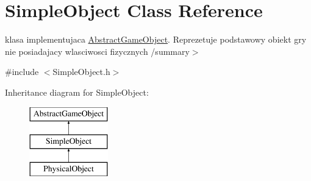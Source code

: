 \hypertarget{class_simple_object}{}\section{Simple\+Object Class Reference}
\label{class_simple_object}


klasa implementujaca \hyperlink{class_abstract_game_object}{Abstract\+Game\+Object}. Reprezetuje podstawowy obiekt gry nie posiadajacy wlasciwosci fizycznych /summary$>$  




{\ttfamily \#include $<$Simple\+Object.\+h$>$}

Inheritance diagram for Simple\+Object\+:\begin{figure}[H]
\begin{center}
\leavevmode
\includegraphics[height=3.000000cm]{class_simple_object}
\end{center}
\end{figure}
